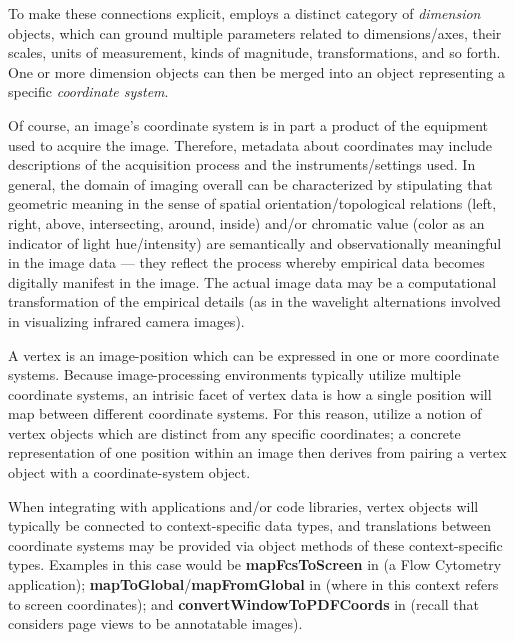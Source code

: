 {\begin{description}
To make these connections explicit, \AXFI{} 
employs a distinct category of \textit{dimension} 
objects, which can ground multiple parameters 
related to dimensions/axes, their scales, units 
of measurement, kinds of magnitude, transformations, 
and so forth.  One or more dimension objects 
can then be merged into an object representing 
a specific \textit{coordinate system}.

\label{ph:acquisition}Of course, an image's 
coordinate system is in part 
a product of the equipment used to acquire the 
image.  Therefore, metadata about coordinates 
may include descriptions of the 
acquisition process and the 
instruments/settings used.  In general, 
the domain of imaging overall can be 
characterized by stipulating that 
geometric meaning in the sense of spatial 
orientation/topological relations (left, right, above, 
intersecting, around, inside) and/or chromatic 
value (color as an indicator of light hue/intensity) 
are semantically and observationally meaningful 
in the image data --- they reflect the 
process whereby empirical data becomes digitally 
manifest in the image.  The actual image data 
may be a computational transformation of the 
empirical details (as in the wavelight alternations 
involved in visualizing infrared camera images).

\item[Vertices]  A vertex is an image-position which 
can be expressed in one or more coordinate systems.  
Because image-processing environments typically 
utilize multiple coordinate systems, an 
intrisic facet of vertex data is how 
a single position will map between different 
coordinate systems.  For this reason, \AXFI{} 
utilize a notion of vertex objects which are 
distinct from any specific coordinates; 
a concrete representation of one position 
within an image then derives from 
pairing a vertex object with a coordinate-system 
object.  

When integrating with applications and/or code 
libraries, \AXFI{} vertex objects will typically 
be connected to context-specific data types, 
and translations between coordinate systems 
may be provided via object methods of 
these context-specific types.  Examples 
in this case would be \textbf{mapFcsToScreen} in 
\FACSanadu{} (a Flow Cytometry application);  
\textbf{mapToGlobal}/\textbf{mapFromGlobal} 
in \Qt{} (where  in this context 
refers to screen coordinates); and 
\textbf{convertWindowToPDFCoords} in \XPDF{} 
(recall that \AXFI{} considers \PDF{} page 
views to be annotatable images).


\end{description}}
